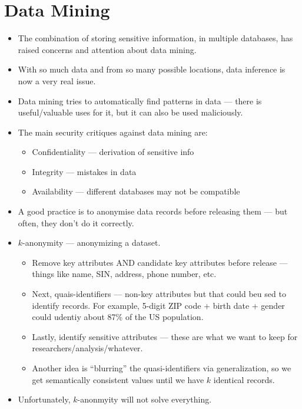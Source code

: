 \documentclass{article}
\begin{document}
\section{Data Mining}
\begin{itemize}
    \item The combination of storing sensitive information, in multiple databases, has raised concerns and attention about data mining.
    \item With so much data and from so many possible locations, data inference is now a very real issue.
    \item Data mining tries to automatically find patterns in data --- there is useful/valuable uses for it, but it can also be used maliciously.
    \item The main security critiques against data mining are:
        \begin{itemize}
            \item Confidentiality --- derivation of sensitive info
            \item Integrity --- mistakes in data
            \item Availability --- different databases may not be compatible
        \end{itemize}
    \item A good practice is to anonymise data records before releasing them --- but often, they don't do it correctly.
    \item $k$-anonymity --- anonymizing a dataset.
        \begin{itemize}
            \item Remove key attributes AND candidate key attributes before release --- things like name, SIN, address, phone number, etc.
            \item Next, quais-identifiers --- non-key attributes but that could beu sed to identify records.  For example, 5-digit ZIP code + birth date + gender could udentiy about 87\% of the US population.
            \item Lastly, identify sensitive attributes --- these are what we want to keep for researchers/analysis/whatever.
            \item Another idea is ``blurring'' the quasi-identifiers via generalization, so we get semantically consistent values until we have $k$ identical records.
        \end{itemize}
    \item Unfortunately, $k$-anonmyity will not solve everything.
        \begin{itemize}

\end{itemize}
\end{itemize}
\end{document}
